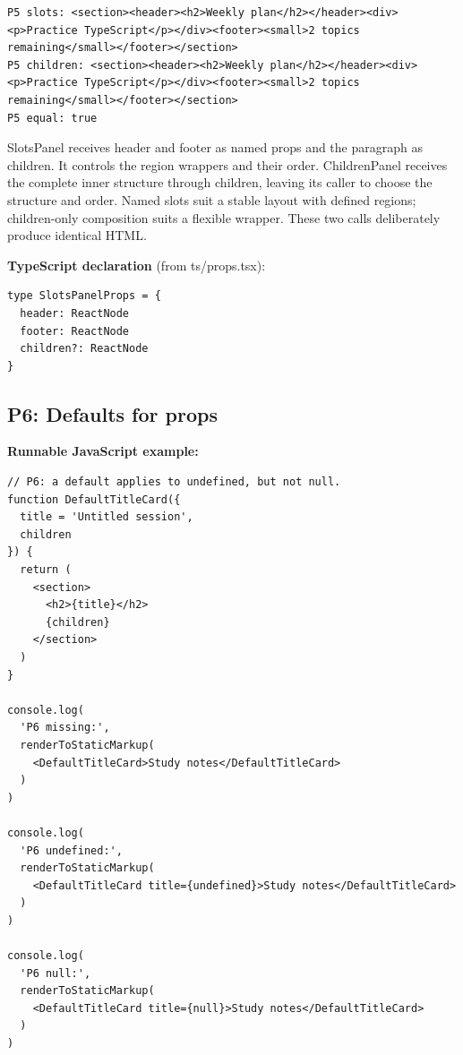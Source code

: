 \documentclass[10pt,a4paper]{article}
\begin{document}
\begin{lstlisting}[language={}]
P5 slots: <section><header><h2>Weekly plan</h2></header><div><p>Practice TypeScript</p></div><footer><small>2 topics remaining</small></footer></section>
P5 children: <section><header><h2>Weekly plan</h2></header><div><p>Practice TypeScript</p></div><footer><small>2 topics remaining</small></footer></section>
P5 equal: true
\end{lstlisting}

SlotsPanel receives header and footer as named props and the paragraph as children. It controls the region wrappers and their order. ChildrenPanel receives the complete inner structure through children, leaving its caller to choose the structure and order. Named slots suit a stable layout with defined regions; children-only composition suits a flexible wrapper. These two calls deliberately produce identical HTML.


\textbf{TypeScript declaration} (from ts/props.tsx):

\begin{lstlisting}[language=GuideJS]
type SlotsPanelProps = {
  header: ReactNode
  footer: ReactNode
  children?: ReactNode
}
\end{lstlisting}

\subsection{P6: Defaults for props}

\textbf{Runnable JavaScript example:}

\begin{lstlisting}[language=GuideJS]
// P6: a default applies to undefined, but not null.
function DefaultTitleCard({
  title = 'Untitled session',
  children
}) {
  return (
    <section>
      <h2>{title}</h2>
      {children}
    </section>
  )
}

console.log(
  'P6 missing:',
  renderToStaticMarkup(
    <DefaultTitleCard>Study notes</DefaultTitleCard>
  )
)

console.log(
  'P6 undefined:',
  renderToStaticMarkup(
    <DefaultTitleCard title={undefined}>Study notes</DefaultTitleCard>
  )
)

console.log(
  'P6 null:',
  renderToStaticMarkup(
    <DefaultTitleCard title={null}>Study notes</DefaultTitleCard>
  )
)
\end{lstlisting}
\end{document}

